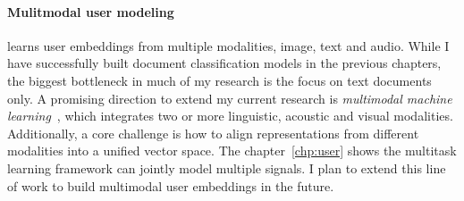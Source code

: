 


\paragraph{Mulitmodal user modeling}
learns user embeddings from multiple modalities, image, text and audio. 
While I have successfully built document classification models in the previous chapters, the biggest bottleneck in much of my research is the focus on text documents only.
A promising direction to extend my current research is \textit{multimodal machine learning}~\cite{baltrusaitis2019multimodal}, which integrates two or more linguistic, acoustic and visual modalities.
Additionally, a core challenge is how to align representations from different modalities into a unified vector space. 
The chapter~\ref{chp:user} shows the multitask learning framework can jointly model multiple signals. 
I plan to extend this line of work to build multimodal user embeddings in the future.
